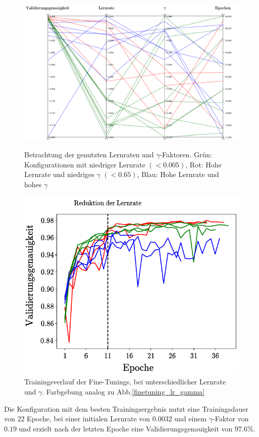 \begin{figure}[h]
\includegraphics[scale=0.58]{NNOPT/finetuning_lr_gamma.pdf}
\caption{Betrachtung der genutzten Lernraten und $\gamma$-Faktoren. Grün: Konfigurationen mit niedriger Lernrate $(<0.005)$, Rot: Hohe Lernrate und niedriges $\gamma$ $(<0.65)$, Blau: Hohe Lernrate und hohes $\gamma$}
\label{finetuning_lr_gamma}

\centering
\includegraphics[scale=1]{NNOPT/finetuning_lr_gamma_verlauf.pdf}
\caption{Trainingsverlauf der Fine-Tunings, bei unterschiedlicher Lernrate und $\gamma$. Farbgebung analog zu Abb.\ref{finetuning_lr_gamma}}
\label{finetuning_lr_gamma_verlauf}
\end{figure}
\clearpage
Die Konfiguration mit dem besten Trainingsergebnis nutzt eine Trainingsdauer von $22$ Epoche, bei einer initialen Lernrate von $0.0032$ und einem $\gamma$-Faktor von $0.19$ und erzielt nach der letzten Epoche eine Validierungsgenauigkeit von $97.6\%$.
